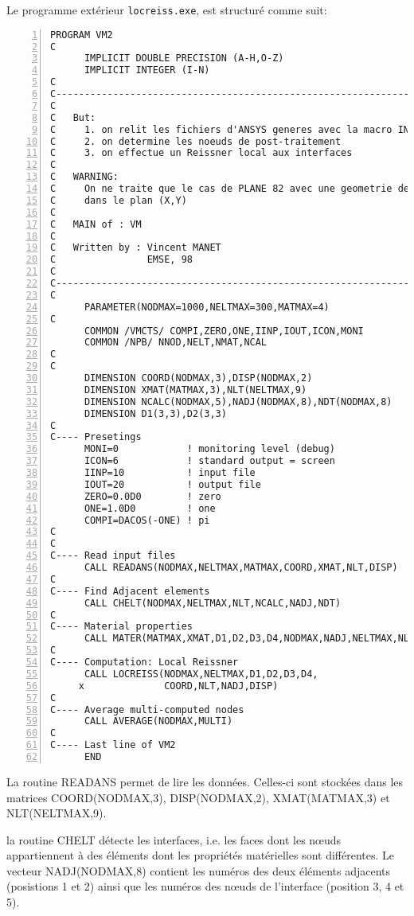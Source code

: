 Le programme extérieur \verb|locreiss.exe|, est structuré comme suit:

\color{gris}\scriptsize
\begin{Verbatim}[numbers=left,numbersep=3pt]
      PROGRAM VM2
C
      IMPLICIT DOUBLE PRECISION (A-H,O-Z)
      IMPLICIT INTEGER (I-N)
C
C--------------------------------------------------------------------------
C
C   But:
C     1. on relit les fichiers d'ANSYS generes avec la macro INTERF
C     2. on determine les noeuds de post-traitement
C     3. on effectue un Reissner local aux interfaces
C
C   WARNING:
C     On ne traite que le cas de PLANE 82 avec une geometrie definie
C     dans le plan (X,Y)
C
C   MAIN of : VM
C
C   Written by : Vincent MANET
C                EMSE, 98
C
C----------------------------------------------------------------------------
C
      PARAMETER(NODMAX=1000,NELTMAX=300,MATMAX=4)
C
      COMMON /VMCTS/ COMPI,ZERO,ONE,IINP,IOUT,ICON,MONI
      COMMON /NPB/ NNOD,NELT,NMAT,NCAL
C
C
      DIMENSION COORD(NODMAX,3),DISP(NODMAX,2)
      DIMENSION XMAT(MATMAX,3),NLT(NELTMAX,9)
      DIMENSION NCALC(NODMAX,5),NADJ(NODMAX,8),NDT(NODMAX,8)
      DIMENSION D1(3,3),D2(3,3)
C
C---- Presetings
      MONI=0            ! monitoring level (debug)
      ICON=6            ! standard output = screen
      IINP=10           ! input file
      IOUT=20           ! output file
      ZERO=0.0D0        ! zero
      ONE=1.0D0         ! one
      COMPI=DACOS(-ONE) ! pi
C
C
C---- Read input files
      CALL READANS(NODMAX,NELTMAX,MATMAX,COORD,XMAT,NLT,DISP)
C
C---- Find Adjacent elements
      CALL CHELT(NODMAX,NELTMAX,NLT,NCALC,NADJ,NDT)
C
C---- Material properties
      CALL MATER(MATMAX,XMAT,D1,D2,D3,D4,NODMAX,NADJ,NELTMAX,NLT)
C
C---- Computation: Local Reissner
      CALL LOCREISS(NODMAX,NELTMAX,D1,D2,D3,D4,
     x              COORD,NLT,NADJ,DISP)
C
C---- Average multi-computed nodes
      CALL AVERAGE(NODMAX,MULTI)
C
C---- Last line of VM2
      END
\end{Verbatim}
\color{black}\normalsize

\medskip
La routine READANS permet de lire les données. Celles-ci sont stockées dans les matrices 
COORD(NODMAX,3), DISP(NODMAX,2), XMAT(MATMAX,3) et NLT(NELTMAX,9).

\medskip
la routine CHELT détecte les interfaces, i.e. les faces dont les nœuds appartiennent à des éléments dont les propriétés
matérielles sont différentes.
Le vecteur NADJ(NODMAX,8) contient les numéros des deux éléments adjacents (posistions 1 et 2) ainsi que les 
numéros des nœuds de l'interface (position 3, 4 et 5).

